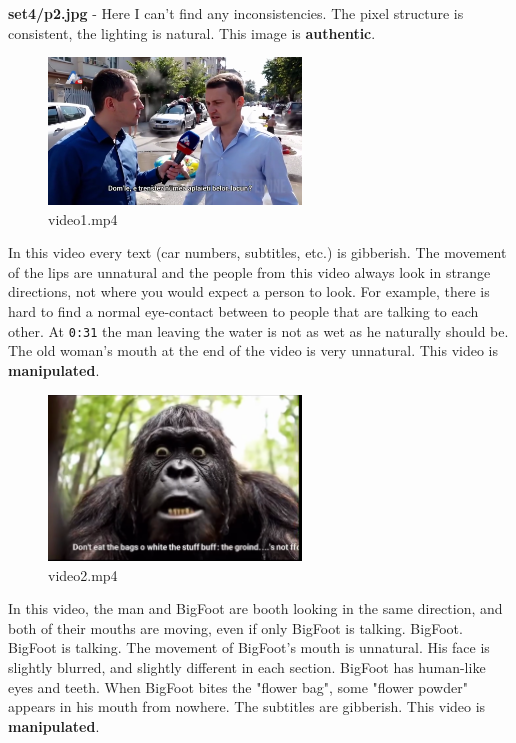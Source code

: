 \documentclass[pdflatex,sn-mathphys-num]{sn-jnl}
\begin{document}
\par \textbf{set4/p2.jpg} \-- Here I can't find any inconsistencies. The pixel structure is consistent, the lighting
is natural. This image is \textbf{authentic}.

\begin{figure}[htbp]
    \centering
    \includegraphics[width=0.6\textwidth]{images/data5_v1.png}
    \caption{video1.mp4}
    \label{fig:video1}
\end{figure}

\par In this video every text (car numbers, subtitles, etc.) is gibberish. The movement of the lips are unnatural and
the people from this video always look in strange directions, not where you would expect a person to look. For example,
there is hard to find a normal eye-contact between to people that are talking to each other. At \texttt{0:31} the man
leaving the water is not as wet as he naturally should be. The old woman's mouth at the end of the video is very
unnatural. This video is \textbf{manipulated}.

\begin{figure}[htbp]
    \centering
    \includegraphics[width=0.6\textwidth]{images/data5_v2.png}
    \caption{video2.mp4}
    \label{fig:video2}
\end{figure}

\par In this video, the man and BigFoot are booth looking in the same direction, and both of their mouths are moving,
even if only BigFoot is talking. BigFoot. BigFoot is talking. The movement of BigFoot's mouth is unnatural. His face
is slightly blurred, and slightly different in each section. BigFoot has human-like eyes and teeth. When BigFoot bites
the "flower bag", some "flower powder" appears in his mouth from nowhere. The subtitles are gibberish. This video is
\textbf{manipulated}.
\end{document}
